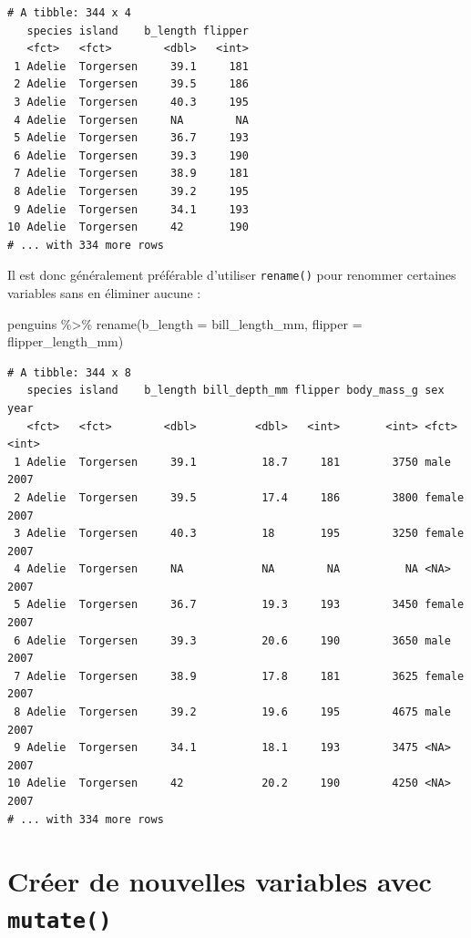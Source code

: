 \documentclass[
  letterpaper,
  DIV=11,
  numbers=noendperiod]{scrreprt}
\newenvironment{Shaded}{\begin{snugshade}}{\end{snugshade}}
\newcommand{\AttributeTok}[1]{\textcolor[rgb]{0.40,0.45,0.13}{#1}}
\newcommand{\FunctionTok}[1]{\textcolor[rgb]{0.28,0.35,0.67}{#1}}
\newcommand{\NormalTok}[1]{\textcolor[rgb]{0.00,0.23,0.31}{#1}}
\newcommand{\SpecialCharTok}[1]{\textcolor[rgb]{0.37,0.37,0.37}{#1}}
\begin{document}
\begin{verbatim}
# A tibble: 344 x 4
   species island    b_length flipper
   <fct>   <fct>        <dbl>   <int>
 1 Adelie  Torgersen     39.1     181
 2 Adelie  Torgersen     39.5     186
 3 Adelie  Torgersen     40.3     195
 4 Adelie  Torgersen     NA        NA
 5 Adelie  Torgersen     36.7     193
 6 Adelie  Torgersen     39.3     190
 7 Adelie  Torgersen     38.9     181
 8 Adelie  Torgersen     39.2     195
 9 Adelie  Torgersen     34.1     193
10 Adelie  Torgersen     42       190
# ... with 334 more rows
\end{verbatim}

Il est donc généralement préférable d'utiliser \texttt{rename()} pour
renommer certaines variables sans en éliminer aucune :

\begin{Shaded}
\begin{Highlighting}[]
\NormalTok{penguins }\SpecialCharTok{\%\textgreater{}\%}
  \FunctionTok{rename}\NormalTok{(}\AttributeTok{b\_length =}\NormalTok{ bill\_length\_mm,}
         \AttributeTok{flipper =}\NormalTok{ flipper\_length\_mm)}
\end{Highlighting}
\end{Shaded}

\begin{verbatim}
# A tibble: 344 x 8
   species island    b_length bill_depth_mm flipper body_mass_g sex     year
   <fct>   <fct>        <dbl>         <dbl>   <int>       <int> <fct>  <int>
 1 Adelie  Torgersen     39.1          18.7     181        3750 male    2007
 2 Adelie  Torgersen     39.5          17.4     186        3800 female  2007
 3 Adelie  Torgersen     40.3          18       195        3250 female  2007
 4 Adelie  Torgersen     NA            NA        NA          NA <NA>    2007
 5 Adelie  Torgersen     36.7          19.3     193        3450 female  2007
 6 Adelie  Torgersen     39.3          20.6     190        3650 male    2007
 7 Adelie  Torgersen     38.9          17.8     181        3625 female  2007
 8 Adelie  Torgersen     39.2          19.6     195        4675 male    2007
 9 Adelie  Torgersen     34.1          18.1     193        3475 <NA>    2007
10 Adelie  Torgersen     42            20.2     190        4250 <NA>    2007
# ... with 334 more rows
\end{verbatim}

\hypertarget{mutate}{%
\section{\texorpdfstring{Créer de nouvelles variables avec
\texttt{mutate()}}{Créer de nouvelles variables avec mutate()}}\label{mutate}}
\end{document}

